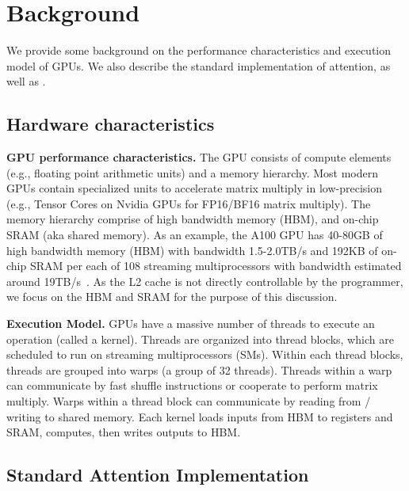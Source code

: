 \section{Background}
\label{sec:background}

We provide some background on the performance characteristics and execution
model of GPUs.
We also describe the standard implementation of attention, as well as
\sysnameone.

\subsection{Hardware characteristics}
\label{subsec:hardware}

\textbf{GPU performance characteristics.}
The GPU consists of compute elements (e.g., floating point arithmetic units) and
a memory hierarchy.
Most modern GPUs contain specialized units to accelerate matrix multiply in
low-precision (e.g., Tensor Cores on Nvidia GPUs for FP16/BF16 matrix multiply).
The memory hierarchy comprise of high bandwidth memory (HBM), and on-chip SRAM
(aka shared memory).
As an example, the A100 GPU has 40-80GB of high bandwidth memory (HBM) with
bandwidth 1.5-2.0TB/s and 192KB of on-chip SRAM per each of 108 streaming
multiprocessors with bandwidth estimated around 19TB/s~\citep{jia2018dissecting,
  jia2021dissecting}.
As the L2 cache is not directly controllable by the programmer, we focus on the
HBM and SRAM for the purpose of this discussion.

\textbf{Execution Model.}
GPUs have a massive number of threads to execute an operation
(called a kernel).
Threads are organized into thread blocks, which are scheduled to run on
streaming multiprocessors (SMs).
Within each thread blocks, threads are grouped into warps (a group of 32
threads).
Threads within a warp can communicate by fast shuffle instructions or cooperate
to perform matrix multiply.
Warps within a thread block can communicate by reading from / writing to shared memory.
Each kernel loads inputs from HBM to registers and SRAM, computes, then writes outputs to HBM.

\subsection{Standard Attention Implementation}
\label{subsec:standard_attn}

